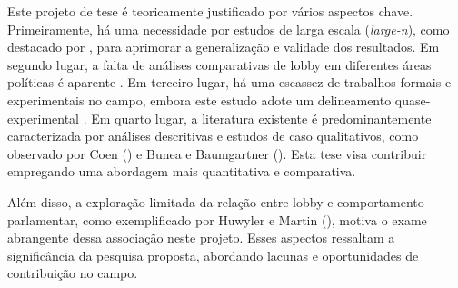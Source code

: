 Este projeto de tese é teoricamente justificado por vários aspectos chave. Primeiramente, há uma necessidade por estudos de larga escala (\textit{large-n}), como destacado por \cite{Bunea2014}, para aprimorar a generalização e validade dos resultados. Em segundo lugar, a falta de análises comparativas de lobby em diferentes áreas políticas é aparente \cite{Bunea2014}. Em terceiro lugar, há uma escassez de trabalhos formais e experimentais no campo, embora este estudo adote um delineamento quase-experimental \cite{Bunea2014}. Em quarto lugar, a literatura existente é predominantemente caracterizada por análises descritivas e estudos de caso qualitativos, como observado por Coen (\citeyear{Coen2007}) e Bunea e Baumgartner (\citeyear{Bunea2014}). Esta tese visa contribuir empregando uma abordagem mais quantitativa e comparativa. 

Além disso, a exploração limitada da relação entre lobby e comportamento parlamentar, como exemplificado por Huwyler e Martin (\citeyear{Huwyler2022}), motiva o exame abrangente dessa associação neste projeto. Esses aspectos ressaltam a significância da pesquisa proposta, abordando lacunas e oportunidades de contribuição no campo.

